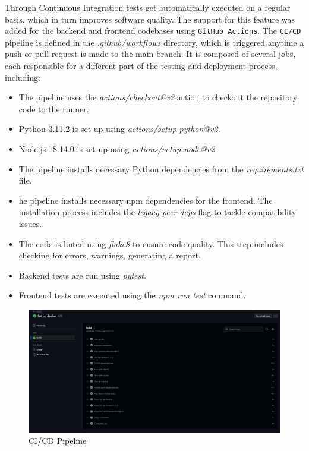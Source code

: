 Through Continuous Integration tests get automatically executed on a regular basis, which in turn improves software quality. The support for this feature was added for the backend and frontend codebases using \texttt{GitHub Actions}. The \texttt{CI/CD} pipeline is defined in the \textit{.github/workflows} directory, which is triggered anytime a push or pull request is made to the main branch. It is composed of several jobs, each responsible for a different part of the testing and deployment process, including:

\begin{itemize}
    \item The pipeline uses the \textit{actions/checkout@v2} action to checkout the repository code to the runner.
    \item Python 3.11.2 is set up using \textit{actions/setup-python@v2}.
    \item Node.js 18.14.0 is set up using \textit{actions/setup-node@v2}.
    \item The pipeline installs necessary Python dependencies from the \textit{requirements.txt} file.
    \item he pipeline installs necessary npm dependencies for the frontend. The installation process includes the \textit{legacy-peer-deps} flag to tackle compatibility issues.
    \item The code is linted using \textit{flake8} to ensure code quality. This step includes checking for errors, warnings, generating a report.
    \item Backend tests are run using \textit{pytest}.
    \item Frontend tests are executed using the \textit{npm run test} command.
\end{itemize}

\begin{figure}[!ht]
    \centering
    \includegraphics[width=1\linewidth]{LATEX/Appendices/Images/Pipeline_CI_CD/github_actions_CI_CD_pipeline.png}
    \caption{CI/CD Pipeline}
    \label{fig:CI/CD-Pipeline}
\end{figure}

